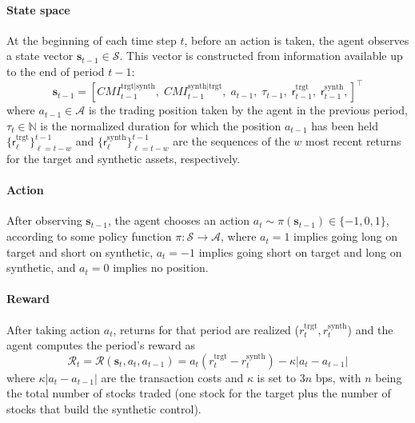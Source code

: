 \paragraph{State space}
At the beginning of each time step $t$, before an action is taken, the agent observes a state vector $\mathbf s_{t-1} \in \mathcal{S}$. This vector is constructed from information available up to the end of period $t-1$:
%
$$
\mathbf{s}_{t-1} = 
\left[
CMI_{t-1}^{\text{trgt}|\text{synth}}, 
\; 
CMI_{t-1}^{\text{synth}|\text{trgt}}, 
\; 
a_{t-1}, 
\; 
\tau_{t-1}, 
\; 
\mathsf{r}^{\text{trgt}}_{t-1}, 
\; 
\mathsf{r}^{\text{synth}}_{t-1}, 
\right]^{\top}
$$
%
where
$a_{t-1}\in\mathcal A$ is the trading position taken by the agent in the previous period,
$\tau_t \in \mathbb N$ is the normalized duration for which the position $a_{t-1}$ has been held
$\{\mathsf{r}^{\text{trgt}}_\ell\}_{\ell=t-w}^{t-1}$ and 
$\{\mathsf{r}^{\text{synth}}_\ell\}_{\ell=t-w}^{t-1}$
are the sequences of the $w$ most recent returns for the target and synthetic assets, respectively.

\paragraph{Action}
After observing $\mathbf s_{t-1}$, the agent chooses an action $a_{t} \sim \pi(\mathbf s_{t-1}) \in\{-1,0,1\}$, 
according to some policy function $\pi: \mathcal S \to \mathcal A$, where
$a_{t}=1$ implies going long on target and short on synthetic, 
$a_{t}=-1$ implies going short on target and long on synthetic, and
$a_{t}=0$ implies no position.

\paragraph{Reward}
After taking action $a_t$, returns for that period are realized ($r_t^{\text{trgt}}, r_t^{\text{synth}}$) and the agent computes the period's reward as
$$
\mathcal R_{t} = \mathcal R(\mathbf s_t, a_t, a_{t-1}) = a_t (r_t^{\text{trgt}} - r_t^{\text{synth}}) - \kappa |a_{t}-a_{t-1}|
$$
where $\kappa |a_{t}-a_{t-1}|$ are the transaction costs and $\kappa$ is set to $3n$ bps, with $n$ being the total number of stocks traded (one stock for the target plus the number of stocks that build the synthetic control).

